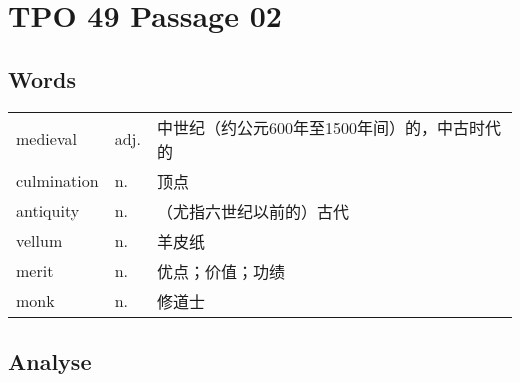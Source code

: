 \section{TPO 49 Passage 02}

\subsection{Words}

\begin{tabular}{lll}
    medieval    & adj. & 中世纪（约公元600年至1500年间）的，中古时代的 \\
    culmination & n.   & 顶点                         \\
    antiquity   & n.   & （尤指六世纪以前的）古代               \\
    vellum      & n.   & 羊皮纸                        \\
    merit       & n.   & 优点；价值；功绩                   \\
    monk        & n.   & 修道士                        \\
\end{tabular}

\subsection{Analyse}

